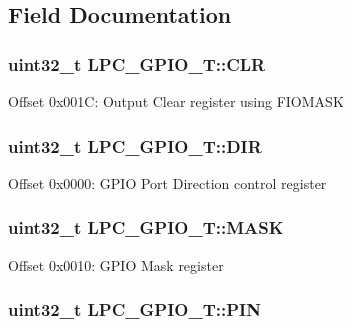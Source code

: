 \subsection{Field Documentation}
\hypertarget{structLPC__GPIO__T_aba8161f685588a1ca79702207083e6ab}{
\subsubsection[{C\-L\-R}]{ uint32\-\_\-t L\-P\-C\-\_\-\-G\-P\-I\-O\-\_\-\-T\-::\-C\-L\-R}}\label{structLPC__GPIO__T_aba8161f685588a1ca79702207083e6ab}
Offset 0x001\-C\-: Output Clear register using F\-I\-O\-M\-A\-S\-K \hypertarget{structLPC__GPIO__T_a753957fa7e1c261e57255c1db8d62bb7}{
\subsubsection[{D\-I\-R}]{ uint32\-\_\-t L\-P\-C\-\_\-\-G\-P\-I\-O\-\_\-\-T\-::\-D\-I\-R}}\label{structLPC__GPIO__T_a753957fa7e1c261e57255c1db8d62bb7}
Offset 0x0000\-: G\-P\-I\-O Port Direction control register \hypertarget{structLPC__GPIO__T_a5b0ae096141efd7298aad95ca7b3370e}{
\subsubsection[{M\-A\-S\-K}]{ uint32\-\_\-t L\-P\-C\-\_\-\-G\-P\-I\-O\-\_\-\-T\-::\-M\-A\-S\-K}}\label{structLPC__GPIO__T_a5b0ae096141efd7298aad95ca7b3370e}
Offset 0x0010\-: G\-P\-I\-O Mask register \hypertarget{structLPC__GPIO__T_a1311cc8cf63279d1bdfca5d48c6ccf0a}{
\subsubsection[{P\-I\-N}]{ uint32\-\_\-t L\-P\-C\-\_\-\-G\-P\-I\-O\-\_\-\-T\-::\-P\-I\-N}}\label{structLPC__GPIO__T_a1311cc8cf63279d1bdfca5d48c6ccf0a}

